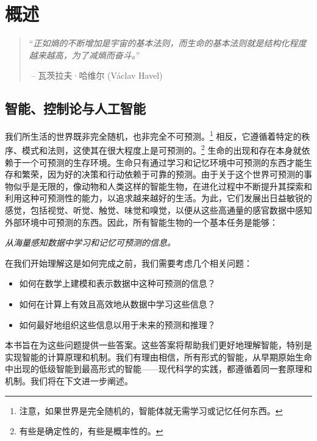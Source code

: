\documentclass[../../book-main_zh.tex]{subfiles}
\begin{document}
\chapter{概述}
\label{ch:intro}

\begin{quote}
“{\em 正如熵的不断增加是宇宙的基本法则，而生命的基本法则就是结构化程度越来越高，为了减熵而奋斗。}”

$~$\hfill -- 瓦茨拉夫·哈维尔 (V\'{a}clav Havel)
 \end{quote}
\vspace{5mm}



\section{智能、控制论与人工智能}
我们所生活的世界既非完全随机，也非完全不可预测。\footnote{注意，如果世界是完全随机的，智能体就无需学习或记忆任何东西。} 相反，它遵循着特定的秩序、模式和法则，这使其在很大程度上是可预测的。\footnote{有些是确定性的，有些是概率性的。} 生命的出现和存在本身就依赖于一个可预测的生存环境。生命只有通过学习和记忆环境中可预测的东西才能生存和繁荣，因为好的决策和行动依赖于可靠的预测。由于关于这个世界可预测的事物似乎是无限的，像动物和人类这样的智能生物，在进化过程中不断提升其探索和利用这种可预测性的能力，以追求越来越好的生活。为此，它们发展出日益敏锐的感觉，包括视觉、听觉、触觉、味觉和嗅觉，以便从这些高通量的感官数据中感知外部环境中可预测的东西。因此，所有智能生物的一个基本任务是能够：
\begin{center}
    {\em 从海量感知数据中学习和记忆可预测的信息。}
\end{center}
在我们开始理解这是如何完成之前，我们需要考虑几个相关问题：
\begin{itemize}
    \item 如何在数学上建模和表示数据中这种可预测的信息？
    \item 如何在计算上有效且高效地从数据中学习这些信息？
    \item 如何最好地组织这些信息以用于未来的预测和推理？
\end{itemize}
本书旨在为这些问题提供一些答案。这些答案将帮助我们更好地理解智能，特别是实现智能的计算原理和机制。我们有理由相信，所有形式的智能，从早期原始生命中出现的低级智能到最高形式的智能——现代科学的实践，都遵循着同一套原理和机制。我们将在下文进一步阐述。
\end{document}

